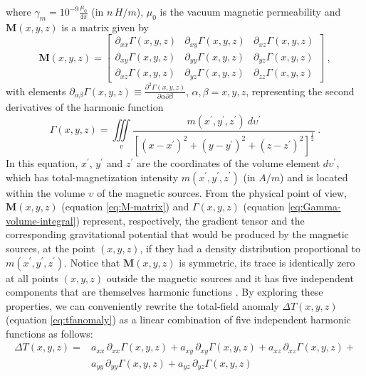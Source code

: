 where $\gamma_{m} = 10^{-9} \frac{\mu_{0}}{4 \pi}$ (in $n \, H / m $), 
$\mu_{0}$ is the vacuum magnetic permeability and $\mathbf{M}(x, y, z)$ is a matrix 
given by
\begin{equation}
	\mathbf{M}(x, y, z) = \begin{bmatrix}
		\partial_{xx} \Gamma(x, y, z) & 
		\partial_{xy} \Gamma(x, y, z) &
		\partial_{xz} \Gamma(x, y, z) \\
		\partial_{xy} \Gamma(x, y, z) & 
		\partial_{yy} \Gamma(x, y, z) &
		\partial_{yz} \Gamma(x, y, z) \\
		\partial_{xz} \Gamma(x, y, z) & 
		\partial_{yz} \Gamma(x, y, z) &
		\partial_{zz} \Gamma(x, y, z)
	\end{bmatrix} \: ,
	\label{eq:M-matrix}
\end{equation}
with elements
$\partial_{\alpha\beta} \Gamma(x, y, z) \equiv 
\frac{\partial^{2} \Gamma(x, y, z)}{\partial \alpha \partial \beta}$, 
$\alpha, \beta = x, y, z$, representing the second derivatives of the harmonic
function
\begin{equation}
\Gamma(x, y, z) = \iiint\limits_{\upsilon} 
\frac{m(x^{\prime}, y^{\prime}, z^{\prime}) \: d\upsilon^{\prime}}
{\left[ (x-x^{\prime})^2 + (y-y^{\prime})^2 + (z-z^{\prime})^2 \right]^{\frac{1}{2}}} \: .
\label{eq:Gamma-volume-integral}
\end{equation}
In this equation, $x^{\prime}$, $y^{\prime}$ and $z^{\prime}$ are the coordinates 
of the volume element $d \upsilon^{\prime}$, which has total-magnetization intensity
$m(x^{\prime}, y^{\prime}, z^{\prime})$ (in $A/m$) and is located within the 
volume $\upsilon$ of the magnetic sources.
From the physical point of view, $\mathbf{M}(x, y, z)$ (equation \ref{eq:M-matrix})
and $\Gamma(x, y, z)$ (equation \ref{eq:Gamma-volume-integral}) represent, respectively, 
the gradient tensor and the corresponding gravitational potential that would be produced by 
the magnetic sources, at the point $(x, y, z)$, if they had a density distribution proportional 
to $m(x^{\prime}, y^{\prime}, z^{\prime})$.
Notice that $\mathbf{M}(x, y, z)$ is symmetric, its trace is identically zero at all points 
$(x, y, z)$ outside the magnetic sources and it has five independent components that are 
themselves harmonic functions \citep{pedersen_rasmussen1990}.
By exploring these properties, we can conveniently rewrite the 
total-field anomaly $\Delta T(x, y, z)$ (equation \ref{eq:tfanomaly}) as a linear combination 
of five independent harmonic functions as follows:
\begin{equation}
\begin{split}
\Delta T(x, y, z) = 
&a_{xx} \, \partial_{xx} \Gamma(x, y, z) + 
a_{xy} \, \partial_{xy} \Gamma(x, y, z) + 
a_{xz} \, \partial_{xz} \Gamma(x, y, z) + \\
&a_{yy} \, \partial_{yy} \Gamma(x, y, z) + 
a_{yz} \, \partial_{yz} \Gamma(x, y, z)
\end{split}
\label{eq:tfanomaly-alternative}
\end{equation}
